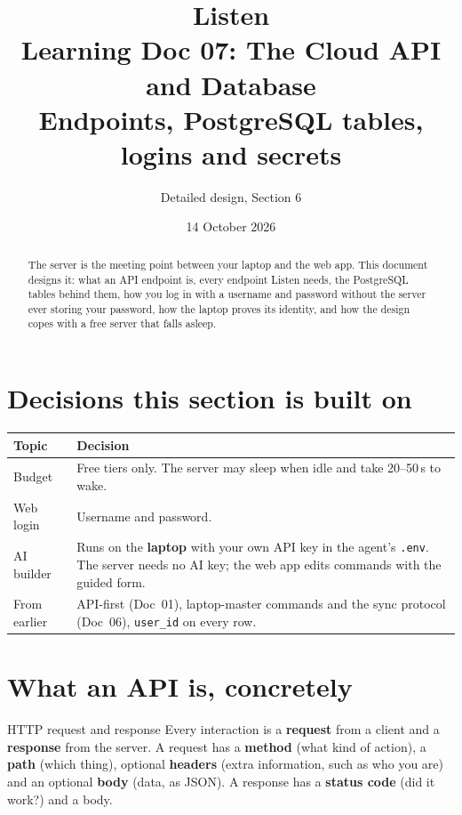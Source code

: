 \documentclass[11pt,a4paper]{article}
\title{\textbf{Listen}\\[4pt]\large Learning Doc 07: The Cloud API and Database\\
       \normalsize Endpoints, PostgreSQL tables, logins and secrets}
\author{Detailed design, Section 6}
\date{14 October 2026}
\begin{document}
\maketitle

\begin{abstract}
\noindent The server is the meeting point between your laptop and the web app. This document
designs it: what an API endpoint is, every endpoint Listen needs, the PostgreSQL tables behind
them, how you log in with a username and password without the server ever storing your password,
how the laptop proves its identity, and how the design copes with a free server that falls
asleep.
\end{abstract}

\tableofcontents
\newpage

\section{Decisions this section is built on}
\begin{center}
\renewcommand{\arraystretch}{1.2}
\begin{tabularx}{\textwidth}{l X}
\toprule
\textbf{Topic} & \textbf{Decision} \\
\midrule
Budget      & Free tiers only. The server may sleep when idle and take 20--50\,s to wake. \\
Web login   & Username and password. \\
AI builder  & Runs on the \textbf{laptop} with your own API key in the agent's \texttt{.env}. The server needs no AI key; the web app edits commands with the guided form. \\
From earlier & API-first (Doc~01), laptop-master commands and the sync protocol (Doc~06), \texttt{user\_id} on every row. \\
\bottomrule
\end{tabularx}
\end{center}

\section{What an API is, concretely}

\begin{concept}{HTTP request and response}
Every interaction is a \textbf{request} from a client and a \textbf{response} from the server.
A request has a \textbf{method} (what kind of action), a \textbf{path} (which thing), optional
\textbf{headers} (extra information, such as who you are) and an optional \textbf{body} (data,
as JSON). A response has a \textbf{status code} (did it work?) and a body.
\end{concept}
\end{document}
